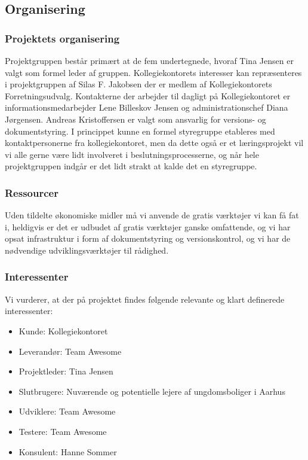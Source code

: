 \documentclass[12pt, a4paper]{report}
\begin{document}
\subsection{Organisering}
\subsubsection{Projektets organisering}
Projektgruppen består primært at de fem undertegnede, hvoraf Tina Jensen er valgt som formel leder af gruppen. Kollegiekontorets interesser kan repræsenteres i projektgruppen af Silas F. Jakobsen der er medlem af Kollegiekontorets Forretningsudvalg. Kontakterne der arbejder til dagligt på Kollegiekontoret er informationsmedarbejder Lene Billeskov Jensen og administrationschef Diana Jørgensen. Andreas Kristoffersen er valgt som ansvarlig for versions- og dokumentstyring.
I princippet kunne en formel styregruppe etableres med kontaktpersonerne fra kollegiekontoret, men da dette også er et læringsprojekt vil vi alle gerne være lidt involveret i beslutningsprocesserne, og når hele projektgruppen indgår er det lidt strakt at kalde det en styregruppe.

\subsubsection{Ressourcer}
Uden tildelte økonomiske midler må vi anvende de gratis værktøjer vi kan få fat i, heldigvis er det er udbudet af gratis værktøjer ganske omfattende, og vi har opsat infrastruktur i form af dokumentstyring og versionskontrol, og vi har de nødvendige udviklingsværktøjer til rådighed.

\subsubsection{Interessenter}
Vi vurderer, at der på projektet findes følgende relevante og klart definerede interessenter:
\begin{itemize}
\item Kunde: Kollegiekontoret
\item Leverandør: Team Awesome
\item Projektleder: Tina Jensen
\item Slutbrugere: Nuværende og potentielle lejere af ungdomsboliger i Aarhus
\item Udviklere: Team Awesome
\item Testere: Team Awesome
\item Konsulent: Hanne Sommer
\end{itemize}
\end{document}
